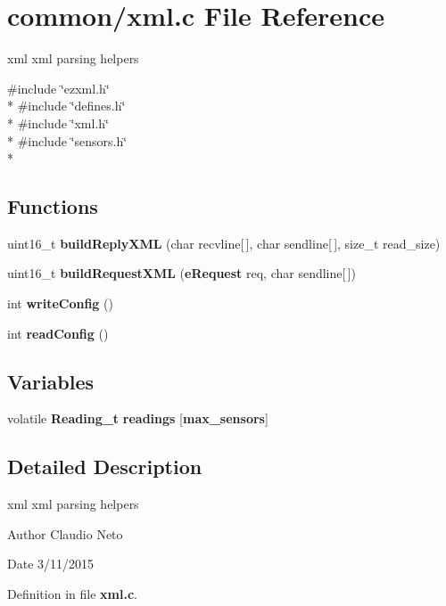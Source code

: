 \section{common/xml.c File Reference}
\label{xml_8c}


xml xml parsing helpers  


{\ttfamily \#include \char`\"{}ezxml.\-h\char`\"{}}\\*
{\ttfamily \#include \char`\"{}defines.\-h\char`\"{}}\\*
{\ttfamily \#include \char`\"{}xml.\-h\char`\"{}}\\*
{\ttfamily \#include \char`\"{}sensors.\-h\char`\"{}}\\*
\subsection*{Functions}
\begin{DoxyCompactItemize}
\item 
uint16\-\_\-t {\bf build\-Reply\-X\-M\-L} (char recvline[$\,$], char sendline[$\,$], size\-\_\-t read\-\_\-size)
\item 
uint16\-\_\-t {\bf build\-Request\-X\-M\-L} ({\bf e\-Request} req, char sendline[$\,$])
\item 
int {\bf write\-Config} ()
\item 
int {\bf read\-Config} ()
\end{DoxyCompactItemize}
\subsection*{Variables}
\begin{DoxyCompactItemize}
\item 
volatile {\bf Reading\-\_\-t} {\bf readings} [{\bf max\-\_\-sensors}]
\end{DoxyCompactItemize}


\subsection{Detailed Description}
xml xml parsing helpers \begin{DoxyAuthor}{Author}
Claudio Neto
\end{DoxyAuthor}
\begin{DoxyDate}{Date}
3/11/2015 
\end{DoxyDate}


Definition in file {\bf xml.\-c}.



